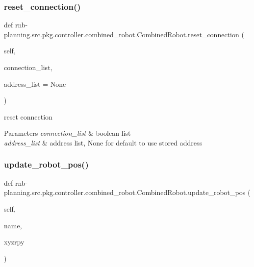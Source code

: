 \subsubsection{\texorpdfstring{reset\+\_\+connection()}{reset\_connection()}}
{\footnotesize\ttfamily def rnb-\/planning.\+src.\+pkg.\+controller.\+combined\+\_\+robot.\+Combined\+Robot.\+reset\+\_\+connection (\begin{DoxyParamCaption}\item[{}]{self,  }\item[{}]{connection\+\_\+list,  }\item[{}]{address\+\_\+list = {\ttfamily None} }\end{DoxyParamCaption})}



reset connection 


\begin{DoxyParams}{Parameters}
{\em connection\+\_\+list} & boolean list \\
\hline
{\em address\+\_\+list} & address list, None for default to use stored address \\
\hline
\end{DoxyParams}
\mbox{\label{classrnb-planning_1_1src_1_1pkg_1_1controller_1_1combined__robot_1_1_combined_robot_a6cef8899224b996aa6200e9abd5b9ae0}} 
\subsubsection{\texorpdfstring{update\+\_\+robot\+\_\+pos()}{update\_robot\_pos()}}
{\footnotesize\ttfamily def rnb-\/planning.\+src.\+pkg.\+controller.\+combined\+\_\+robot.\+Combined\+Robot.\+update\+\_\+robot\+\_\+pos (\begin{DoxyParamCaption}\item[{}]{self,  }\item[{}]{name,  }\item[{}]{xyzrpy }\end{DoxyParamCaption})}



